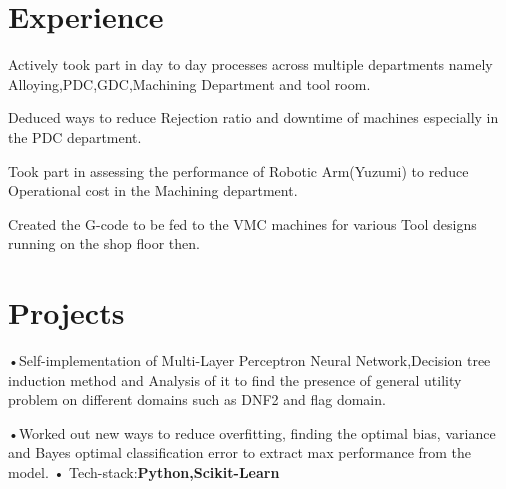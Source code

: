 \documentclass[]{deedy-resume-openfont}
\begin{document}
\begin{minipage}[t]{0.66\textwidth} 

\section{Experience}
\vspace{\topsep} %
\begin{tightemize}

\item Actively took part in day to day processes across multiple departments namely Alloying,PDC,GDC,Machining Department and tool room. 
\item Deduced ways to reduce Rejection ratio and downtime of machines especially in the PDC department.
\item Took part in assessing the performance of Robotic Arm(Yuzumi) to reduce Operational cost in the Machining department.
\item Created the G-code to be fed to the VMC machines for various Tool designs running on the shop floor then.
\end{tightemize}

\sectionsep




\section{Projects}
\location{}
\item •Self-implementation of Multi-Layer Perceptron Neural Network,Decision tree induction method and Analysis of it to find the presence of general utility problem on different domains such as DNF2 and flag domain.
\item •Worked out new ways to reduce overfitting, finding the optimal bias, variance and Bayes optimal classification error to extract max performance from the model.\newline
• Tech-stack:\textbf{Python,Scikit-Learn}


\end{minipage}
\end{document}
